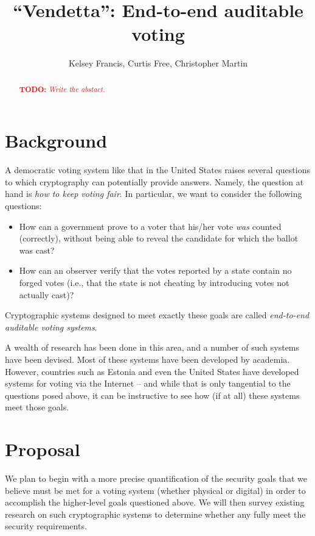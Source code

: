 \documentclass[10pt]{article}
\title{``Vendetta'': End-to-end auditable voting}
\date{}
\author{Kelsey Francis, Curtis Free, Christopher Martin}
\newcommand{\todo}[1]{\textcolor{red}{\textbf{TODO:} \emph{#1}}}
\newcommand{\term}[1]{\textit{#1}}
\begin{document}
	\maketitle

	\begin{abstract}
		\todo{Write the abstact.}
	\end{abstract}

	\begin{multicols}{2}

		\section{Background}

			A democratic voting system like that in the United States raises several questions to which
			cryptography can potentially provide answers. Namely, the question at hand is \emph{how to keep
			voting fair}. In particular, we want to consider the following questions:
			\begin{itemize}

				\item
					How can a government prove to a voter that his/her vote \emph{was} counted (correctly),
					without being able to reveal the candidate for which the ballot was cast?

				\item
					How can an observer verify that the votes reported by a state contain no forged votes (i.e.,
					that the state is not cheating by introducing votes not actually cast)?

			\end{itemize}
			Cryptographic systems designed to meet exactly these goals are called \term{end-to-end auditable
			voting systems}\cite{end_to_end}.

			A wealth of research has been done in this area, and a number of such systems have been devised.
			Most of these systems have been developed by academia. However, countries such as Estonia and
			even the United States have developed systems for voting via the Internet
			\cite{estonia,us_vs_est} -- and while that is only tangential to the questions posed above, it
			can be instructive to see how (if at all) these systems meet those goals.

		\section{Proposal}

			We plan to begin with a more precise quantification of the security goals that we believe must
			be met for a voting system (whether physical or digital) in order to accomplish the higher-level
			goals questioned above. We will then survey existing research on such cryptographic systems to
			determine whether any fully meet the security requirements.


\end{multicols}
\end{document}

